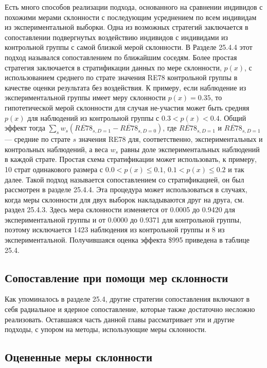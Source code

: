 Есть много способов реализации подхода, основанного на сравнении индивидов с похожими мерами склонности с последующим усреднением по всем индивидам из экспериментальной выборки. Одна из возможных стратегий заключается в сопоставлении подвергнутых воздействию индивидов с индивидами из контрольной группы с самой близкой мерой склонности. 
В Разделе 25.4.4 этот подход назывался сопоставлением по ближайшим соседям. Более простая стратегия заключается в стратификации данных по мере склонности, $p(x)$, с использованием среднего по страте значения RE78 контрольной группы в качестве оценки результата без воздействия. 
К примеру, если наблюдение из экспериментальной группы имеет меру склонности $p(x) = 0.35$, то гипотетической мерой склонности для случая не-участия может быть средняя $p(x)$ для наблюдений из контрольной группы с $0.3 < p(x) < 0.4$. Общий эффект тогда $\sum_s w_s (\overline{RE78}_{s,D=1} - \overline{RE78}_{s,D=0})$, где $\overline{RE78}_{s,D=1}$ и $\overline{RE78}_{s,D=1}$ --- средние по страте $s$ значения RE78 для, соответственно, экспериментальных и контрольных наблюдений, а веса $w_s$ равны доле экспериментальных наблюдений в каждой страте. 
Простая схема стратификации может использовать, к примеру, 10 страт одинакового размера с $0.0 < p(x) \leq 0.1$, $0.1 < p(x) \leq 0.2$ и так далее. Такой подход называется сопоставлением со стратификацией, он был рассмотрен в разделе 25.4.4. Эта процедура может использоваться в случаях, когда меры склонности для двух выборок накладываются друг на друга, см. раздел 25.4.3. Здесь мера склонности изменяется от 0.0005 до 0.9420 для экспериментальной группы и от 0.0000 до 0.9371 для контрольной группы, поэтому  исключается 1423 наблюдения из контрольной группы и 8 из экспериментальной. Получившаяся оценка эффекта \$995 приведена в таблице 25.4. 

\subsection{Сопоставление при помощи мер склонности}

Как упоминалось в разделе 25.4, другие стратегии сопоставления включают в себя радиальное и ядерное сопоставление, которые также достаточно несложно реализовать. Оставшаяся часть данной главы рассматривает эти и другие подходы, с упором на методы, использующие меры склонности. 

\subsection*{Оцененные меры склонности}

